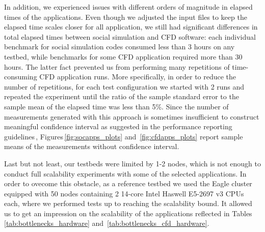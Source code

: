 In addition, we experienced issues with different orders of magnitude in elapsed times of the applications.
Even though we adjusted the input files to keep the elapsed time scales closer for all application,
we still had significant differences in total elapsed times between social simulation and CFD software:
each individual benchmark for social simulation codes consumed less than 3 hours on any testbed,
while benchmarks for some CFD application required more than 30 hours.
The latter fact prevented us from performing many repetitions of time-consuming CFD application runs.
More specifically, in order to reduce the number of repetitions, for each test configuration
we started with 2 runs and repeated the experiment %
until the ratio of the sample standard error to the sample mean of the elapsed time was less than 5\%.
Since the number of measurements generated with this approach
is sometimes insufficient to construct meaningful confidence interval as suggested in the performance reporting guidelines\,\cite{2015:Hoefler},
Figures\,\ref{fig:socapps_plots} and~\ref{fig:cfdapps_plots} report sample means of the measurements without confidence interval.

Last but not least,
our testbeds were limited by 1-2 nodes,
which is not enough to conduct full scalability experiments with some of the selected applications.
In order to ovecome this obstacle,
as a reference testbed we used the Eagle cluster equipped with 50 nodes containing 2 14-core Intel Haswell E5-2697 v3 CPUs each,
where we performed tests up to reaching the scalability bound.
It allowed us to get an impression on the scalability of the applications reflected in Tables\,\ref{tab:bottlenecks_hardware} and~\ref{tab:bottlenecks_cfd_hardware}.


